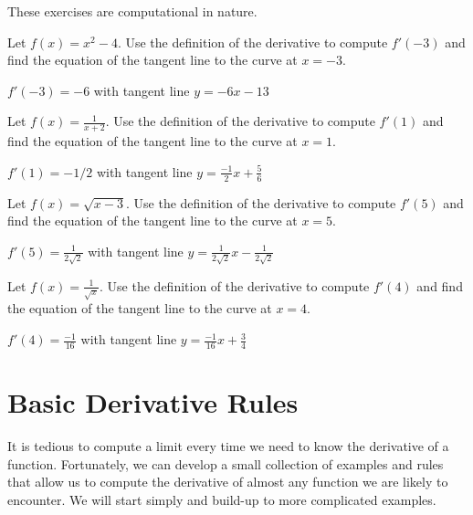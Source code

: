 \begin{exercises}
\break
\noindent These exercises are computational in nature.

\begin{exercise}
Let $f(x) = x^2 -4$. Use the definition of the derivative to compute
$f'(-3)$ and find the equation of the tangent line to the curve at
$x=-3$.
\begin{answer}
$f'(-3) = -6$ with tangent line $y = -6x -13$
\end{answer}
\end{exercise}

\begin{exercise}
Let $f(x) = \frac{1}{x+2}$. Use the definition of the derivative to compute
$f'(1)$ and find the equation of the tangent line to the curve at
$x=1$.
\begin{answer}
$f'(1) = -1/2$ with tangent line $y = \frac{-1}{2}x + \frac{5}{6}$
\end{answer}
\end{exercise}

\begin{exercise}
Let $f(x) = \sqrt{x-3}$. Use the definition of the derivative to compute
$f'(5)$ and find the equation of the tangent line to the curve at
$x=5$.
\begin{answer}
$f'(5) = \frac{1}{2\sqrt{2}}$ with tangent line $y = \frac{1}{2\sqrt{2}}x -\frac{1}{2\sqrt{2}}$
\end{answer}
\end{exercise}

\begin{exercise}
Let $f(x) = \frac{1}{\sqrt{x}}$. Use the definition of the derivative
to compute $f'(4)$ and find the equation of the tangent line to the
curve at $x=4$.
\begin{answer}
$f'(4) = \frac{-1}{16}$ with tangent line $y = \frac{-1}{16}x +\frac{3}{4}$
\end{answer}
\end{exercise}

\end{exercises}




\section{Basic Derivative Rules}


It is tedious to compute a limit every time we need to know the
derivative of a function.  Fortunately, we can develop a small
collection of examples and rules that allow us to compute the
derivative of almost any function we are likely to encounter.  We will
start simply and build-up to more complicated examples.



